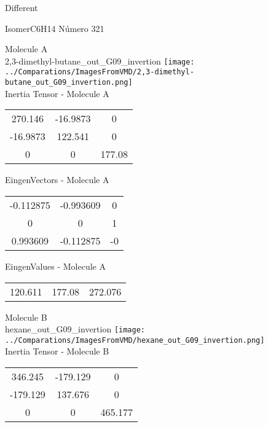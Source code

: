 \begin{center}
\vtab
\vtab
\textcolor{NavyBlue}{\Large Different}
\end{center}

 \newpage

\vtab[-2cm]
\begin{center}
{\large IsomerC6H14 \tab Número 321}
\end{center}
\begin{multicols}{2}
\begin{center}

Molecule A \\ 
2,3-dimethyl-butane\_out\_G09\_invertion
\texttt{[image: ../Comparations/ImagesFromVMD/2,3-dimethyl-butane\_out\_G09\_invertion.png]}
\\
Inertia Tensor - Molecule A \\
\vtab

\begin{tabular}{|c c c|}
270.146	 & 	-16.9873	 & 	0	 \\
-16.9873	 & 	122.541	 & 	0	 \\
0	 & 	0	 & 	177.08
\end{tabular}

\vtab
 EingenVectors - Molecule A     \\
\vtab
\begin{tabular}{|c c c|}
-0.112875	 & 	-0.993609	 & 	0	 \\
0	 & 	0	 & 	1	 \\
0.993609	 & 	-0.112875	 & 	-0
\end{tabular}

\vtab
 EingenValues - Molecule A     \\
\vtab
\begin{tabular}{|c c c|}
120.611	 & 	177.08	 & 	272.076	 \\
\end{tabular}
\columnbreak

Molecule B \\ 
hexane\_out\_G09\_invertion
\texttt{[image: ../Comparations/ImagesFromVMD/hexane\_out\_G09\_invertion.png]}
\\
Inertia Tensor - Molecule B \\
\vtab

\begin{tabular}{|c c c|}
346.245	 & 	-179.129	 & 	0	 \\
-179.129	 & 	137.676	 & 	0	 \\
0	 & 	0	 & 	465.177
\end{tabular}


\end{center}
\end{multicols}
